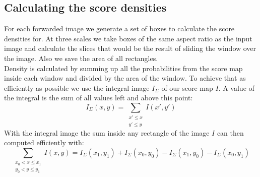 \subsection{Calculating the score densities}
\label{sec:pipeline:eval:density}
For each forwarded image we generate a set of boxes to calculate the score densities for. At three scales we take boxes of the same aspect ratio as the input image and calculate the slices that would be the result of sliding the window over the image. Also we save the area of all rectangles.\\
Density is calculated by summing up all the probabilities from the score map inside each window and divided by the area of the window. To achieve that as efficiently as possible we use the integral image $I_\Sigma$ of our score map $I$. A value of the integral is the sum of all values left and above this point:
\begin{equation}
    I_\Sigma(x, y) = \sum_{\substack{x' \le x\\ y' \le y}} I(x', y')
\end{equation}
With the integral image the sum inside any rectangle of the image $I$ can then computed efficiently with:
\begin{equation}
    \sum_{\substack{x_0 < x \le x_1\\ y_0 < y \le y_1}}I(x,y) = I_\Sigma(x_1, y_1) + I_\Sigma(x_0, y_0) - I_\Sigma(x_1, y_0) - I_\Sigma(x_0, y_1)
\end{equation}

